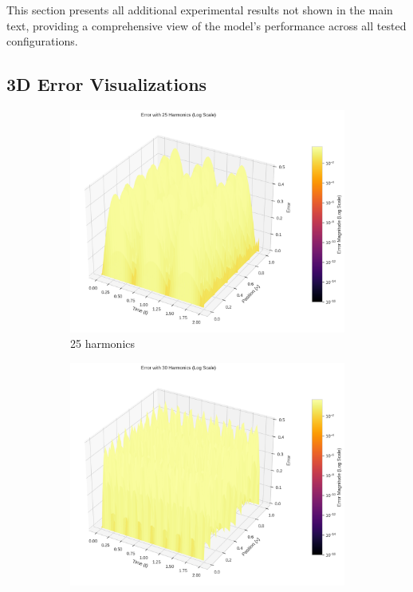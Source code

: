 This section presents all additional experimental results not shown in the main text, providing a comprehensive view of the model's performance across all tested configurations.

\subsection{3D Error Visualizations}

\begin{figure}[H]
    \centering
    \begin{subfigure}[b]{0.32\textwidth}
        \centering
        \includegraphics[width=\textwidth]{figures/3d_comparison_error_25h.png}
        \caption{25 harmonics}
    \end{subfigure}
    \hfill
    \begin{subfigure}[b]{0.32\textwidth}
        \centering
        \includegraphics[width=\textwidth]{figures/3d_comparison_error_30h.png}

\end{subfigure}
\end{figure}
